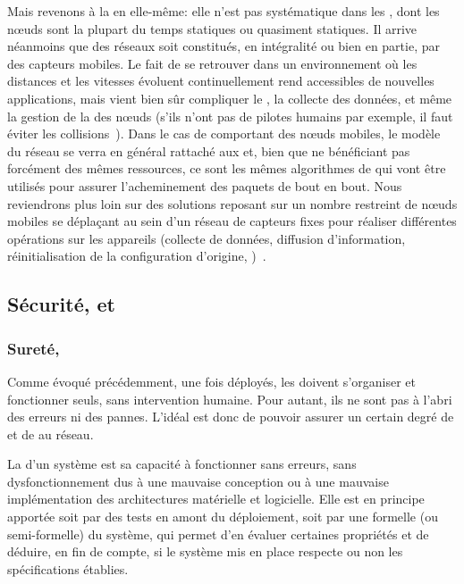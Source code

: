 Mais revenons à la  en elle-même: elle n'est pas systématique dans les \rcsfs, dont les nœuds sont la plupart du temps statiques ou quasiment statiques.
Il arrive néanmoins que des réseaux soit constitués, en intégralité ou bien en partie, par des capteurs mobiles.
Le fait de se retrouver dans un environnement où les distances et les vitesses évoluent continuellement rend accessibles de nouvelles applications, mais vient bien sûr compliquer le , la collecte des données, et même la gestion de la  des nœuds (s'ils n'ont pas de pilotes humains par exemple, il faut éviter les collisions~\cite{E-ZCGGK12}).
Dans le cas de \rcs comportant des nœuds mobiles, le modèle du réseau se verra en général rattaché aux \manet et, bien que ne bénéficiant pas forcément des mêmes ressources, ce sont les mêmes algorithmes de  qui vont être utilisés pour assurer l'acheminement des paquets de bout en bout.
Nous reviendrons plus loin sur des solutions reposant sur un nombre restreint de nœuds mobiles se déplaçant au sein d'un réseau de capteurs fixes pour réaliser différentes opérations sur les appareils (collecte de données, diffusion d'information, réinitialisation de la configuration d'origine, \etc)~\cite{HR13}.

    \subsection{Sécurité,  et \resilience}
        \subsubsection{Sureté, \resilience}
Comme évoqué précédemment, une fois déployés, les \rcs doivent s'organiser et fonctionner seuls, sans intervention humaine.
Pour autant, ils ne sont pas à l'abri des erreurs ni des pannes.
L'idéal est donc de pouvoir assurer un certain degré de  et de \resilience au réseau.

La  d'un système est sa capacité à fonctionner sans erreurs, \cad sans dysfonctionnement dus à une mauvaise conception ou à une mauvaise implémentation des architectures matérielle et logicielle.
Elle est en principe apportée soit par des tests en amont du déploiement, soit par une  formelle (ou semi-formelle) du système, qui permet d'en évaluer certaines propriétés et de déduire, en fin de compte, si le système mis en place respecte ou non les spécifications établies.

